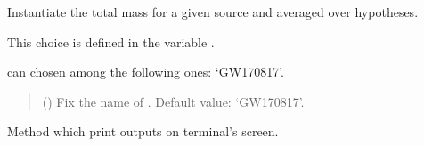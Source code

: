 \documentclass[letterpaper,10pt,english]{sphinxmanual}
\begin{document}
\begin{fulllineitems}
\label{\detokenize{source/api/setup_astro_gw:nucleardatapy.setup_astro_gw.SetupAstroGWAverage}}
\pysigstartsignatures
\pysiglinewithargsret
{}
{}
{}
\pysigstopsignatures
\sphinxAtStartPar
Instantiate the total mass for a given source and averaged over hypotheses.

\sphinxAtStartPar
This choice is defined in the variable .

\sphinxAtStartPar
{} can chosen among the following ones: ‘GW170817’.
\begin{quote}\begin{description}
\sphinxAtStartPar
{} (\sphinxstyleliteralemphasis{\sphinxupquote{, }}) \textendash{} Fix the name of . Default value: ‘GW170817’.

\end{description}\end{quote}

\sphinxAtStartPar
{}

\begin{fulllineitems}
\label{\detokenize{source/api/setup_astro_gw:nucleardatapy.setup_astro_gw.SetupAstroGWAverage.print_outputs}}
\pysigstartsignatures
\pysiglinewithargsret
{}
{}
{}
\pysigstopsignatures
\sphinxAtStartPar
Method which print outputs on terminal’s screen.

\end{fulllineitems}


\end{fulllineitems}

\end{document}
